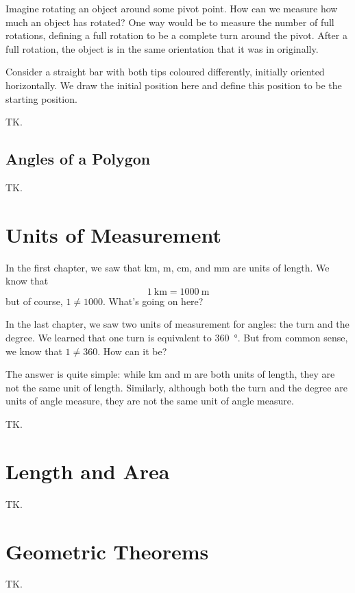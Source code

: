 \documentclass[a4paper,10pt]{report}
\begin{document}
Imagine rotating an object around some pivot point. How can we measure how much
an object has rotated? One way would be to measure the number of full rotations,
defining a full rotation to be a complete turn around the pivot. After a full
rotation, the object is in the same orientation that it was in originally.

Consider a straight bar with both tips coloured differently, initially oriented
horizontally. We draw the initial position here and define this position to be
the starting position.

TK.

\section{Angles of a Polygon}

TK.

\chapter{Units of Measurement}

In the first chapter, we saw that \si{\kilo\metre}, \si{\metre},
\si{\centi\metre}, and \si{\milli\metre} are units of length. We know that \[
  \SI{1}{\kilo\metre} = \SI{1000}{\metre}
\] but of course, \(1\ne1000\). What's going on here?

In the last chapter, we saw two units of measurement for angles: the turn and
the degree. We learned that one turn is equivalent to \SI{360}{\degree}. But
from common sense, we know that \(1 \ne 360\). How can it be?

The answer is quite simple: while \si{\kilo\metre} and \si{\metre} are both
units of length, they are not the same unit of length. Similarly, although both
the turn and the degree are units of angle measure, they are not the same unit
of angle measure.

TK.

\chapter{Length and Area}

TK.

\chapter{Geometric Theorems}

TK.


\printglossaries

\cleardoublepage
{}
\listoffigures
\end{document}

